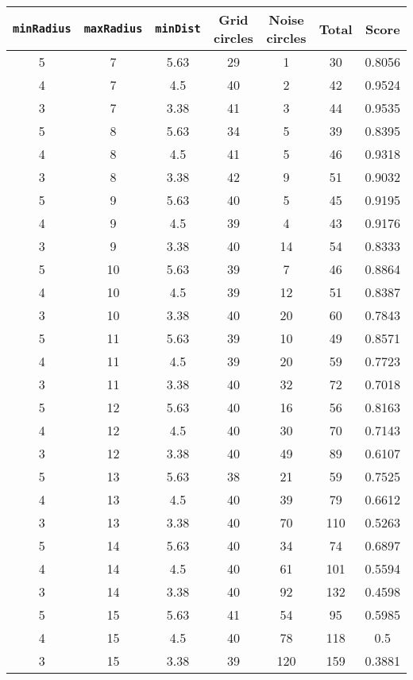 \documentclass[letterpaper, 12pt]{article}
\begin{document}
\begin{longtable}{|c|c|c|c|c|c|c|}
\hline
\textbf{\texttt{minRadius}} & \textbf{\texttt{maxRadius}} & \textbf{\texttt{minDist}} & \textbf{Grid circles} & \textbf{Noise circles} & \textbf{Total} & \textbf{Score} \\
\hline
5 & 7 & 5.63 & 29 & 1 & 30 & 0.8056 \\
\hline
4 & 7 & 4.5 & 40 & 2 & 42 & 0.9524 \\
\hline
3 & 7 & 3.38 & 41 & 3 & 44 & 0.9535 \\
\hline
5 & 8 & 5.63 & 34 & 5 & 39 & 0.8395 \\
\hline
4 & 8 & 4.5 & 41 & 5 & 46 & 0.9318 \\
\hline
3 & 8 & 3.38 & 42 & 9 & 51 & 0.9032 \\
\hline
5 & 9 & 5.63 & 40 & 5 & 45 & 0.9195 \\
\hline
4 & 9 & 4.5 & 39 & 4 & 43 & 0.9176 \\
\hline
3 & 9 & 3.38 & 40 & 14 & 54 & 0.8333 \\
\hline
5 & 10 & 5.63 & 39 & 7 & 46 & 0.8864 \\
\hline
4 & 10 & 4.5 & 39 & 12 & 51 & 0.8387 \\
\hline
3 & 10 & 3.38 & 40 & 20 & 60 & 0.7843 \\
\hline
5 & 11 & 5.63 & 39 & 10 & 49 & 0.8571 \\
\hline
4 & 11 & 4.5 & 39 & 20 & 59 & 0.7723 \\
\hline
3 & 11 & 3.38 & 40 & 32 & 72 & 0.7018 \\
\hline
5 & 12 & 5.63 & 40 & 16 & 56 & 0.8163 \\
\hline
4 & 12 & 4.5 & 40 & 30 & 70 & 0.7143 \\
\hline
3 & 12 & 3.38 & 40 & 49 & 89 & 0.6107 \\
\hline
5 & 13 & 5.63 & 38 & 21 & 59 & 0.7525 \\
\hline
4 & 13 & 4.5 & 40 & 39 & 79 & 0.6612 \\
\hline
3 & 13 & 3.38 & 40 & 70 & 110 & 0.5263 \\
\hline
5 & 14 & 5.63 & 40 & 34 & 74 & 0.6897 \\
\hline
4 & 14 & 4.5 & 40 & 61 & 101 & 0.5594 \\
\hline
3 & 14 & 3.38 & 40 & 92 & 132 & 0.4598 \\
\hline
5 & 15 & 5.63 & 41 & 54 & 95 & 0.5985 \\
\hline
4 & 15 & 4.5 & 40 & 78 & 118 & 0.5 \\
\hline
3 & 15 & 3.38 & 39 & 120 & 159 & 0.3881 \\

\end{longtable}
\end{document}
